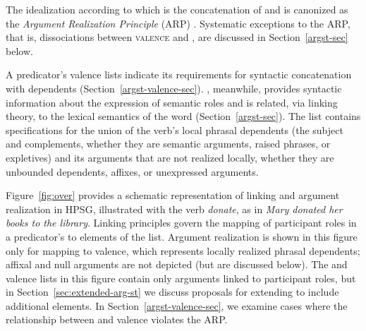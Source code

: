 \documentclass[output=paper
 	        ,biblatex
                ,babelshorthands
                ,newtxmath
                ,draftmode
                ,colorlinks, citecolor=brown
]{langscibook}
\begin{document}
\noindent
The idealization according to which \argst is the concatenation of \subj and \comps is canonized as
the \emph{Argument Realization Principle} (ARP)
\citep[494]{SWB2003a}.  Systematic exceptions to the ARP, that is, dissociations between
\textsc{valence} and \argst, are discussed in Section~\ref{argst-sec} below.

A predicator's valence lists indicate its requirements for syntactic concatenation with dependents (Section~\ref{argst-valence-sec}).  \argst, meanwhile, provides syntactic
information about the expression of semantic roles and is related, via linking theory, to the
lexical semantics of the word (Section~\ref{argst-sec}).  The \argst list contains specifications
for the union of the verb's local phrasal dependents (the subject and complements, whether they are
semantic arguments, raised phrases, or expletives) and its arguments that are not realized locally,
whether they are unbounded dependents, affixes, or unexpressed
arguments.

Figure~\ref{fig:over} provides a schematic representation of %
linking and argument realization in HPSG,  illustrated with the verb \textit{donate}, as in
\textit{Mary donated her books to the library}.   Linking principles govern the mapping of
participant roles in a predicator's \content to %
elements of the \argst list.   Argument realization
is shown in this figure only for mapping to valence, which represents locally realized phrasal
dependents; affixal and null arguments are not depicted (but are discussed below). 
The \argst and valence lists in this figure contain only arguments linked to participant
roles,  but in
Section~\ref{sec:extended-arg-st} we discuss proposals for extending \argst to include additional
elements. In Section~\ref{argst-valence-sec}, we examine cases where the relationship between \argst
and valence violates the ARP.
\end{document}
